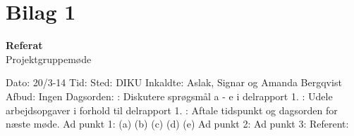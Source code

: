 \documentclass[a4paper,12pt]{article}
\begin{document}
\section{Bilag 1}
\begin{center}
\huge{\bf{Referat}}
\\
\normalsize{Projektgruppemøde}
\end{center}
Dato: 20/3-14
\newline
\newline
Tid:
\newline
\newline
Sted: DIKU
\newline
\newline
Inkaldte: Aslak, Signar og Amanda Bergqvist
\newline
\newline
Afbud: Ingen
\newline
\newline
\newline
\newline
Dagsorden:
\newline
{}: Diskutere sprøgsmål a - e i delrapport 1. 
\newline
{}: Udele arbejdsopgaver i forhold til delrapport 1.
\newline
{}: Aftale tidspunkt og dagsorden for næste møde.
\newline
\newline
\newline
\newline
Ad punkt 1:
\newline
\newline
(a)
\newline
\newline
(b)
\newline
\newline
(c)
\newline
\newline
(d)
\newline
\newline
(e)
\newline
\newline
Ad punkt 2:
\newline
\newline
Ad punkt 3:
\newline
\newline
\newline
\newline
Referent: 
\end{document}
